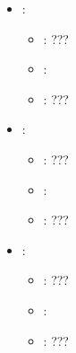 \begin{itemize}
           \begin{itemize}
                \item \optionPossibleValues{}: ???
                \item \optionDefaultValue{}: 
                \item \optionDescrption{}: ???
           \end{itemize}
    \item {}:
           \begin{itemize}
                \item \optionPossibleValues{}: ???
                \item \optionDefaultValue{}: 
                \item \optionDescrption{}: ???
           \end{itemize}
    \item {}:
           \begin{itemize}
                \item \optionPossibleValues{}: ???
                \item \optionDefaultValue{}: 
                \item \optionDescrption{}: ???
           \end{itemize}
    \item {}:
           \begin{itemize}
                \item \optionPossibleValues{}: ???
                \item \optionDefaultValue{}: 
                \item \optionDescrption{}: ???
           \end{itemize}
\end{itemize}
